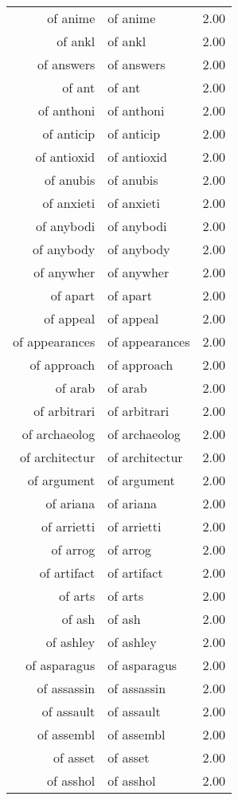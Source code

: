 \begin{table}[ht]
\begin{tabular}{rlr}
  of anime & of anime & 2.00 \\ 
  of ankl & of ankl & 2.00 \\ 
  of answers & of answers & 2.00 \\ 
  of ant & of ant & 2.00 \\ 
  of anthoni & of anthoni & 2.00 \\ 
  of anticip & of anticip & 2.00 \\ 
  of antioxid & of antioxid & 2.00 \\ 
  of anubis & of anubis & 2.00 \\ 
  of anxieti & of anxieti & 2.00 \\ 
  of anybodi & of anybodi & 2.00 \\ 
  of anybody & of anybody & 2.00 \\ 
  of anywher & of anywher & 2.00 \\ 
  of apart & of apart & 2.00 \\ 
  of appeal & of appeal & 2.00 \\ 
  of appearances & of appearances & 2.00 \\ 
  of approach & of approach & 2.00 \\ 
  of arab & of arab & 2.00 \\ 
  of arbitrari & of arbitrari & 2.00 \\ 
  of archaeolog & of archaeolog & 2.00 \\ 
  of architectur & of architectur & 2.00 \\ 
  of argument & of argument & 2.00 \\ 
  of ariana & of ariana & 2.00 \\ 
  of arrietti & of arrietti & 2.00 \\ 
  of arrog & of arrog & 2.00 \\ 
  of artifact & of artifact & 2.00 \\ 
  of arts & of arts & 2.00 \\ 
  of ash & of ash & 2.00 \\ 
  of ashley & of ashley & 2.00 \\ 
  of asparagus & of asparagus & 2.00 \\ 
  of assassin & of assassin & 2.00 \\ 
  of assault & of assault & 2.00 \\ 
  of assembl & of assembl & 2.00 \\ 
  of asset & of asset & 2.00 \\ 
  of asshol & of asshol & 2.00 \\ 

\end{tabular}
\end{table}
